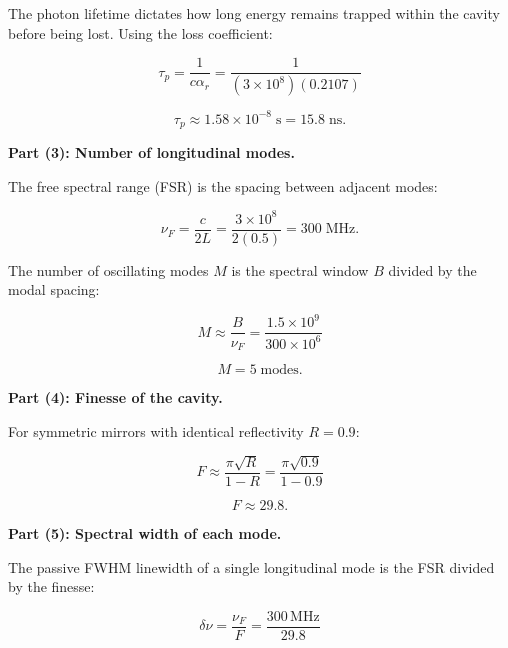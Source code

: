 The photon lifetime dictates how long energy remains trapped within the cavity before being lost. Using the loss coefficient:

\begin{equation*}
  \tau_p = \frac{1}{c\alpha_r} = \frac{1}{(3\times10^{8})(0.2107)}
\end{equation*}

\begin{equation*}
  \boxed{\tau_p \approx 1.58\times10^{-8}\;\text{s} = 15.8\;\text{ns}.}
\end{equation*}

\textbf{Part (3): Number of longitudinal modes.}

The free spectral range (FSR) is the spacing between adjacent modes:

\begin{equation*}
  \nu_F = \frac{c}{2L} = \frac{3\times10^{8}}{2(0.5)} = 300\;\text{MHz}.
\end{equation*}

The number of oscillating modes $M$ is the spectral window $B$ divided by the modal spacing:

\begin{equation*}
  M \approx \frac{B}{\nu_F} = \frac{1.5\times10^{9}}{300\times10^{6}}
\end{equation*}

\begin{equation*}
  \boxed{M = 5\;\text{modes}.}
\end{equation*}

\textbf{Part (4): Finesse of the cavity.}

For symmetric mirrors with identical reflectivity $R=0.9$:

\begin{equation*}
  F \approx \frac{\pi\sqrt{R}}{1 - R} = \frac{\pi\sqrt{0.9}}{1 - 0.9}
\end{equation*}

\begin{equation*}
  \boxed{F \approx 29.8.}
\end{equation*}

\textbf{Part (5): Spectral width of each mode.}

The passive FWHM linewidth of a single longitudinal mode is the FSR divided by the finesse:

\begin{equation*}
  \delta\nu = \frac{\nu_F}{F} = \frac{300\,\text{MHz}}{29.8}
\end{equation*}

